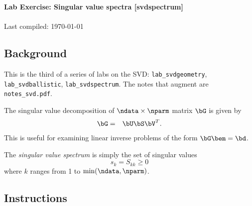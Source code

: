 \documentclass[11pt,titlepage,fleqn]{article}
\newcommand{\nfile}{{\tt notes\_svd.pdf}}
\begin{document}

\begin{spacing}{1.2}
\centering
{\large \bf Lab Exercise: Singular value spectra [svdspectrum]} \\
\cltag\ \\
Last compiled: \today
\end{spacing}


\subsection*{Background}

This is the third of a series of labs on the SVD: \verb+lab_svdgeometry+, \verb+lab_svdballistic+, \verb+lab_svdspectrum+. The notes that augment \citet{Aster} are \nfile.

The singular value decomposition of $\ndata \times \nparm$ matrix $\bG$ is given by
%
\begin{eqnarray*}
\bG &=& \bU\bS\bV^T.
\end{eqnarray*}
%
This is useful for examining linear inverse problems of the form $\bG\bem = \bd$.

The {\em singular value spectrum} is simply the set of singular values
%
\begin{equation*}
s_k = S_{kk} \ge 0
\end{equation*}
%
where $k$ ranges from 1 to $\min(\ndata,\nparm)$.


\subsection*{Instructions}
\end{document}
